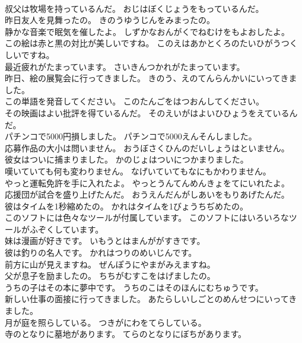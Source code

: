 \documentclass[8pt]{extreport}
\begin{document}
\begin{CJK}{UTF8}{min}
\\	叔父は牧場を持っているんだ。	おじはぼくじょうをもっているんだ。 
\\	昨日友人を見舞ったの。	きのうゆうじんをみまったの。 
\\	静かな音楽で眠気を催したよ。	しずかなおんがくでねむけをもよおしたよ。 
\\	この絵は赤と黒の対比が美しいですね。	このえはあかとくろのたいひがうつくしいですね。 
\\	最近疲れがたまっています。	さいきんつかれがたまっています。 
\\	昨日、絵の展覧会に行ってきました。	きのう、えのてんらんかいにいってきました。 
\\	この単語を発音してください。	このたんごをはつおんしてください。 
\\	その映画はよい批評を得ているんだ。	そのえいがはよいひひょうをえているんだ。 
\\	パチンコで5000円損しました。	パチンコで5000えんそんしました。 
\\	応募作品の大小は問いません。	おうぼさくひんのだいしょうはといません。 
\\	彼女はついに捕まりました。	かのじょはついにつかまりました。 
\\	嘆いていても何も変わりません。	なげいていてもなにもかわりません。 
\\	やっと運転免許を手に入れたよ。	やっとうんてんめんきょをてにいれたよ。 
\\	応援団が試合を盛り上げたんだ。	おうえんだんがしあいをもりあげたんだ。 
\\	彼はタイムを1秒縮めたの。	かれはタイムを1びょうちぢめたの。 
\\	このソフトには色々なツールが付属しています。	このソフトにはいろいろなツールがふぞくしています。 
\\	妹は漫画が好きです。	いもうとはまんががすきです。 
\\	彼は釣りの名人です。	かれはつりのめいじんです。 
\\	前方に山が見えますね。	ぜんぽうにやまがみえますね。 
\\	父が息子を励ましたの。	ちちがむすこをはげましたの。 
\\	うちの子はその本に夢中です。	うちのこはそのほんにむちゅうです。 
\\	新しい仕事の面接に行ってきました。	あたらしいしごとのめんせつにいってきました。 
\\	月が庭を照らしている。	つきがにわをてらしている。 
\\	寺のとなりに墓地があります。	てらのとなりにぼちがあります。 

\end{CJK}
\end{document}
